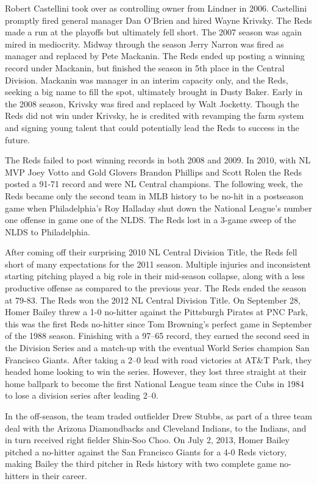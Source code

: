 Robert Castellini took over as controlling owner from Lindner in 2006.
Castellini promptly fired general manager Dan O'Brien and hired Wayne
Krivsky. The Reds made a run at the playoffs but ultimately fell short.
The 2007 season was again mired in mediocrity. Midway through the season
Jerry Narron was fired as manager and replaced by Pete Mackanin. The
Reds ended up posting a winning record under Mackanin, but finished the
season in 5th place in the Central Division. Mackanin was manager in an
interim capacity only, and the Reds, seeking a big name to fill the
spot, ultimately brought in Dusty Baker. Early in the 2008 season,
Krivsky was fired and replaced by Walt Jocketty. Though the Reds did not
win under Krivsky, he is credited with revamping the farm system and
signing young talent that could potentially lead the Reds to success in
the future.

The Reds failed to post winning records in both 2008 and 2009. In 2010,
with NL MVP Joey Votto and Gold Glovers Brandon Phillips and Scott Rolen
the Reds posted a 91-71 record and were NL Central champions. The
following week, the Reds became only the second team in MLB history to
be no-hit in a postseason game when Philadelphia's Roy Halladay shut
down the National League's number one offense in game one of the NLDS.
The Reds lost in a 3-game sweep of the NLDS to Philadelphia.

After coming off their surprising 2010 NL Central Division Title, the
Reds fell short of many expectations for the 2011 season. Multiple
injuries and inconsistent starting pitching played a big role in their
mid-season collapse, along with a less productive offense as compared to
the previous year. The Reds ended the season at 79-83. The Reds won the
2012 NL Central Division Title. On September 28, Homer Bailey threw a
1-0 no-hitter against the Pittsburgh Pirates at PNC Park, this was the
first Reds no-hitter since Tom Browning's perfect game in September of
the 1988 season. Finishing with a 97--65 record, they earned the second
seed in the Division Series and a match-up with the eventual World
Series champion San Francisco Giants. After taking a 2--0 lead with road
victories at AT\&T Park, they headed home looking to win the series.
However, they lost three straight at their home ballpark to become the
first National League team since the Cubs in 1984 to lose a division
series after leading 2--0.

In the off-season, the team traded outfielder Drew Stubbs, as part of a
three team deal with the Arizona Diamondbacks and Cleveland Indians, to
the Indians, and in turn received right fielder Shin-Soo Choo. On July
2, 2013, Homer Bailey pitched a no-hitter against the San Francisco
Giants for a 4-0 Reds victory, making Bailey the third pitcher in Reds
history with two complete game no-hitters in their career.

